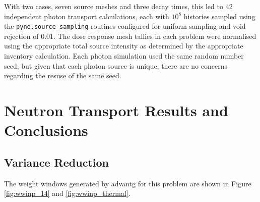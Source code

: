\documentclass[12pt]{article}
\begin{document}
With two cases, seven source meshes and three decay times, this led to 42
independent photon transport calculations, each with $10^8$ histories sampled
using the \texttt{pyne.source\_sampling} routines configured for uniform
sampling and void rejection of 0.01.  The dose response mesh tallies in each
problem were normalised using the appropriate total source intensity as
determined by the appropriate inventory calculation.  Each photon simulation
used the same random number seed, but given that each photon source is unique,
there are no concerns regarding the resuse of the same seed.

\newpage
\clearpage
\section{Neutron Transport Results and Conclusions}
\subsection{Variance Reduction}
The weight windows generated by \gls{advantg} for this problem are shown in Figure
\ref{fig:wwinp_14} and \ref{fig:wwinp_thermal}. 
\end{document}
